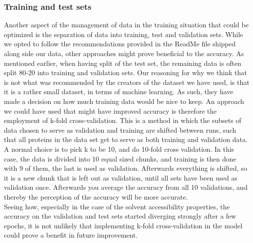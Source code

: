 \subsubsection{Training and test sets}
Another aspect of the management of data in the training situation that could be optimized is the separation of data into training, test and validation sets. While we opted to follow the recommendations provided in the ReadMe file shipped along side our data, other approaches might prove beneficial to the accuracy. As mentioned earlier, when having split of the test set, the remaining data is often split 80-20 into training and validation sets. Our reasoning for why we think that is not what was recommended by the creators of the dataset we have used, is that it is a rather small dataset, in terms of machine learning. As such, they have made a decision on how much training data would be nice to keep. An approach we could have used that might have improved accuracy is therefore the employment of k-fold cross-validation. This is a method in which the subsets of data chosen to serve as validation and training are shifted between runs, such that all proteins in the data set get to serve as both training and validation data. A normal choice is to pick k to be 10, and do 10-fold cross validation. In this case, the data is divided into 10 equal sized chunks, and training is then done with 9 of them, the last is used as validation. Afterwards everything is shifted, so it is a new chunk that is left out as validation, until all sets have been used as validation once. Afterwards you average the accuracy from all 10 validations, and thereby the perception of the accuracy will be more accurate.\\ Seeing how, especially in the case of the solvent accessibility properties, the accuracy on the validation and test sets started diverging strongly after a few epochs, it is not unlikely that implementing k-fold cross-validation in the model could prove a benefit in future improvement. 

